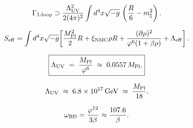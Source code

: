 \begin{equation}
  \Gamma_{1\text{-loop}} \supset
  \frac{\Lambda_{\mathrm{UV}}^2}{2(4\pi)^2}\int d^4x\sqrt{-g}\,
  \left(\frac{R}{6} - m_\xi^2\right).
  \label{P7:eq:1loop}
\end{equation}

\begin{equation}
  S_{\mathrm{eff}} = \int d^4x\sqrt{-g}\!\left[
    \frac{M_{\mathrm{Pl}}^2}{2}R
    + \xi_{\mathrm{NMC}}\rho R
    + \frac{(\partial\rho)^2}{\varphi^6(1+\beta\rho)}
    + \Lambda_{\mathrm{eff}}
  \right].
  \label{P7:eq:Seff}
\end{equation}

\begin{equation}
  \boxed{\Lambda_{\mathrm{UV}} \;=\; \frac{M_{\mathrm{Pl}}}{\varphi^6}\;\approx\;0.0557\,M_{\mathrm{Pl}},}
  \label{P7:eq:MPl}
\end{equation}

\begin{equation}
  \Lambda_{\mathrm{UV}} \;\approx\; 6.8\times10^{17}\,\mathrm{GeV}\;\approx\;\frac{M_{\mathrm{Pl}}}{18}.
  \label{P7:eq:LUV_approx}
\end{equation}

\begin{equation}
  \omega_{\mathrm{BD}} = \frac{\varphi^{12}}{3\beta}
  \approx \frac{107.6}{\beta}.
  \label{P7:eq:oBD}
\end{equation}

